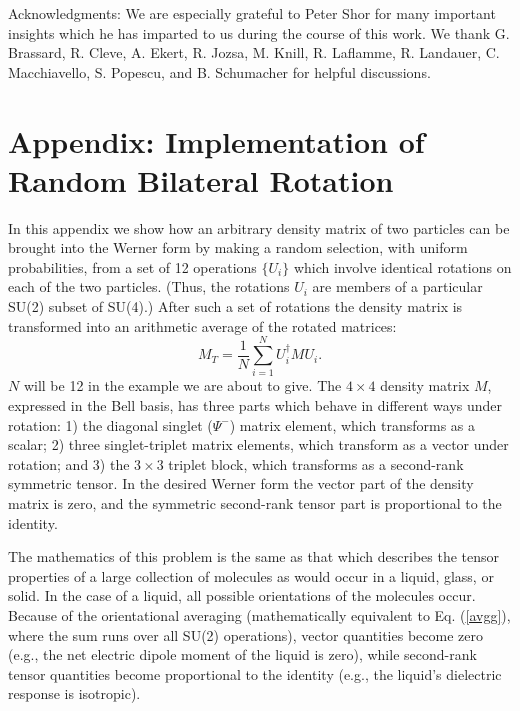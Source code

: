 \bigskip
Acknowledgments: We are especially grateful to Peter Shor for
many important
insights which he has imparted to us during the course of this
work.  We thank G. Brassard, R. Cleve,
A. Ekert, R. Jozsa, M. Knill, R. Laflamme, R. Landauer, 
C. Macchiavello, S. Popescu, and B. Schumacher for helpful
discussions.
 
\appendix
 
\section{Appendix: Implementation of Random Bilateral Rotation}
\label{appx}
 
In this appendix we show how an arbitrary density matrix of two
particles can be brought into the Werner form by making a random
selection, with uniform probabilities, from a set of 12 operations
$\{U_i\}$ which involve identical rotations on each of the two particles.
(Thus, the rotations $U_i$ are members of a particular SU(2) subset of
SU(4).)  After such a set of rotations the density matrix is
transformed into an arithmetic average of the rotated matrices:
\begin{equation}
M_T=\frac{1}{N}\sum_{i=1}^NU_i^\dagger M U_i.\label{avgg}
\end{equation}
$N$ will be 12 in the example we are about to give.  The $4\times 4$
density matrix $M$, expressed in the Bell basis, has three parts which
behave in different ways under rotation: 1) the diagonal singlet
($\Psi^-$) matrix element, which transforms as a scalar; 2) three
singlet-triplet matrix elements, which transform as a vector under
rotation; and 3) the $3\times 3$ triplet block, which transforms as a
second-rank symmetric tensor.  In the desired Werner form the vector
part of the density matrix is zero, and the symmetric second-rank
tensor part is proportional to the identity.
 
The mathematics of this problem is the same as that which describes
the tensor properties of a large collection of molecules as would
occur in a liquid, glass, or solid.  In the case of a liquid, all
possible orientations of the molecules occur.  Because of the
orientational averaging (mathematically equivalent to
Eq. (\ref{avgg}), where the sum runs over all SU(2) operations),
vector quantities become zero (e.g., the net electric dipole moment of
the liquid is zero), while second-rank tensor quantities become
proportional to the identity (e.g., the liquid's dielectric response
is isotropic)\cite{Tink}.
 
